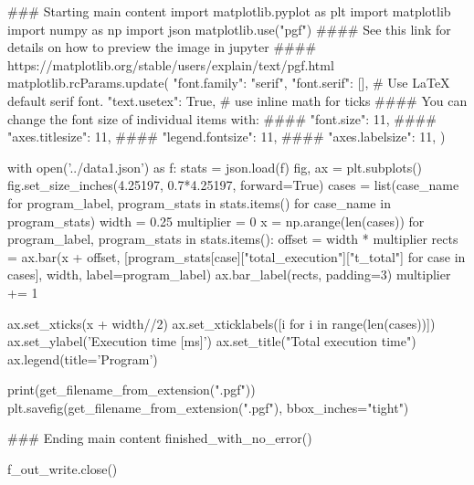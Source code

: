 ### Starting main content
import matplotlib.pyplot as plt
import matplotlib
import numpy as np
import json
matplotlib.use("pgf")
#### See this link for details on how to preview the image in jupyter
#### https://matplotlib.org/stable/users/explain/text/pgf.html
matplotlib.rcParams.update({
  "font.family": "serif",
  "font.serif": [], # Use LaTeX default serif font.
  "text.usetex": True, # use inline math for ticks
  #### You can change the font size of individual items with:
  #### "font.size": 11,
  #### "axes.titlesize": 11,
  #### "legend.fontsize": 11,
  #### "axes.labelsize": 11,
})

with open('../data1.json') as f:
    stats = json.load(f)
fig, ax = plt.subplots()
fig.set_size_inches(4.25197, 0.7*4.25197, forward=True)
cases = list({case_name for program_label, program_stats in stats.items() for case_name in program_stats})
width = 0.25
multiplier = 0
x = np.arange(len(cases))
for program_label, program_stats in stats.items():
    offset = width * multiplier
    rects = ax.bar(x + offset, [program_stats[case]["total_execution"]["t_total"] for case in cases], width, label=program_label)
    ax.bar_label(rects, padding=3)
    multiplier += 1

ax.set_xticks(x + width//2)
ax.set_xticklabels([i for i in range(len(cases))])
ax.set_ylabel('Execution time [ms]')
ax.set_title("Total execution time")
ax.legend(title='Program')

print(get_filename_from_extension(".pgf"))
plt.savefig(get_filename_from_extension(".pgf"), bbox_inches="tight")




### Ending main content
finished_with_no_error()


f_out_write.close()




